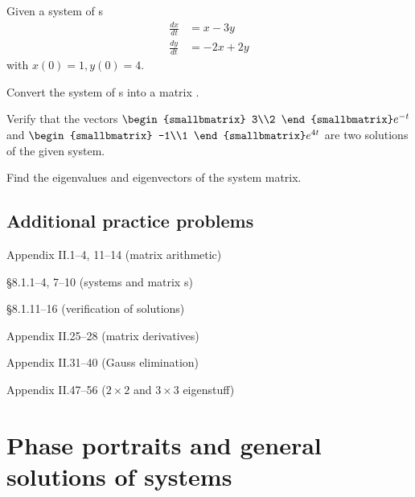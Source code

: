 \begin{question}
Given a system of \ode{}s
  \begin{align*}
  \frac{dx}{dt} & = x-3y\\
  \frac{dy}{dt} & = -2x+2y
  \end{align*}
  with $x(0) = 1, y(0)= 4.$

  \begin{compactenum}[(i)]
\item Convert the system of \ode{}s into a matrix \ode{}.
  \item Verify that the vectors $
    \begin{smallbmatrix}
      3\\2
    \end{smallbmatrix}
e^{-t}$ and $
\begin{smallbmatrix}
-1\\1
\end{smallbmatrix}
e^{4t}$ are two solutions of the given system.

  \item Find the eigenvalues and eigenvectors of the system matrix.
  \end{compactenum}
\end{question}

\subsection*{Additional practice problems}

\begin{compactenum}[(a)]
\item {} Appendix II.1--4, 11--14 (matrix arithmetic)
\item {} \S 8.1.1--4, 7--10 (systems and matrix \ode{}s)
\item {} \S 8.1.11--16 (verification of solutions)
\item {} Appendix II.25--28 (matrix derivatives)
\item {} Appendix II.31--40 (Gauss elimination)
\item {} Appendix II.47--56 (\(2\times 2\) and \(3 \times 3\) eigenstuff)
\end{compactenum}







\section{Phase portraits and general solutions of systems}

